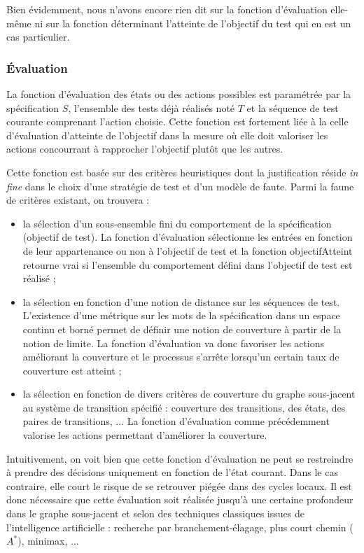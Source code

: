 Bien \'evidemment, nous n'avons encore rien dit sur la fonction
d'\'evaluation elle-m\^eme ni sur la fonction d\'eterminant
l'atteinte de l'objectif du test qui en est un cas particulier. 

\subsubsection{\'Evaluation}

La fonction d'\'evaluation des \'etats ou des actions possibles est
param\'etr\'ee par la sp\'ecification $S$, l'ensemble des tests
d\'ej\`a r\'ealis\'es not\'e $T$ et la s\'equence de test
courante comprenant l'action choisie. Cette fonction est fortement
li\'ee \`a la celle d'\'evaluation d'atteinte de l'objectif  dans
la mesure o\`u elle doit valoriser les actions concourrant \`a
rapprocher l'objectif plut\^ot que les autres.

Cette fonction est bas\'ee sur des crit\`eres heuristiques dont la
justification r\'eside \emph{in fine} dans le choix d'une
strat\'egie de test et d'un mod\`ele de faute. Parmi la faune de
crit\`eres existant, on trouvera : 
\begin{itemize}
  \item la s\'election d'un sous-ensemble fini du comportement de la
    sp\'ecification (objectif de test). La fonction d'\'evaluation
    s\'electionne les entr\'ees en fonction de leur appartenance ou
    non \`a l'objectif de test et la fonction \textsf{objectifAtteint}
    retourne vrai si l'ensemble du comportement d\'efini dans
    l'objectif de test est r\'ealis\'e ;
  \item la s\'election en fonction d'une notion de
    distance sur les s\'equences de
    test. L'existence d'une m\'etrique sur les mots de la
    sp\'ecification dans un espace continu et born\'e permet de
    d\'efinir une notion de couverture \`a partir de la notion de
    limite. La fonction d'\'evaluation va donc favoriser les actions
    am\'eliorant la couverture et le processus s'arr\^ete lorsqu'un
    certain taux de couverture est atteint ;
  \item la s\'election en fonction de divers crit\`eres de
  couverture du graphe sous-jacent au syst\`eme de transition
  sp\'ecifi\'e : couverture des transitions, des \'etats, des paires de
  transitions, ... La fonction d'\'evaluation comme
  pr\'ec\'edemment valorise les actions permettant d'am\'eliorer la
  couverture.
\end{itemize}

Intuitivement, on voit bien que cette fonction d'\'evaluation ne peut
se restreindre \`a prendre des d\'ecisions uniquement en fonction de
l'\'etat courant. Dans le cas contraire, elle court le risque de se
retrouver \og pi\'eg\'ee \fg{} dans des cycles locaux. Il est donc
n\'ecessaire que cette \'evaluation soit r\'ealis\'ee jusqu'\`a
une certaine profondeur dans le graphe sous-jacent et selon des
techniques classiques issues de l'intelligence artificielle :
recherche par branchement-\'elagage, plus court chemin ($A^*$),
minimax, ...

